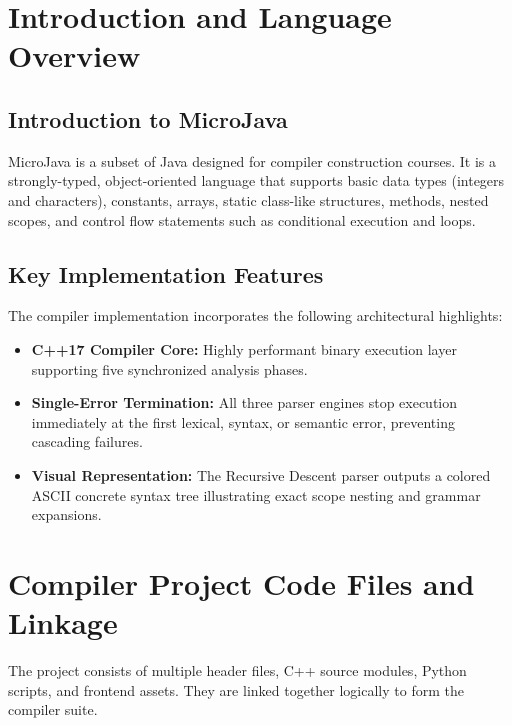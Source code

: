 \documentclass[11pt,a4paper]{article}
\begin{document}
\newpage
\tableofcontents
\newpage

\section{Introduction and Language Overview}

\subsection{Introduction to MicroJava}
MicroJava is a subset of Java designed for compiler construction courses. It is a strongly-typed, object-oriented language that supports basic data types (integers and characters), constants, arrays, static class-like structures, methods, nested scopes, and control flow statements such as conditional execution and loops.

\subsection{Key Implementation Features}
The compiler implementation incorporates the following architectural highlights:

\begin{itemize}
  \item \textbf{C++17 Compiler Core:} Highly performant binary execution layer supporting five synchronized analysis phases.
  \item \textbf{Single-Error Termination:} All three parser engines stop execution immediately at the first lexical, syntax, or semantic error, preventing cascading failures.
  \item \textbf{Visual Representation:} The Recursive Descent parser outputs a colored ASCII concrete syntax tree illustrating exact scope nesting and grammar expansions.
\end{itemize}

\section{Compiler Project Code Files and Linkage}
The project consists of multiple header files, C++ source modules, Python scripts, and frontend assets. They are linked together logically to form the compiler suite.

\newpage
\end{document}
